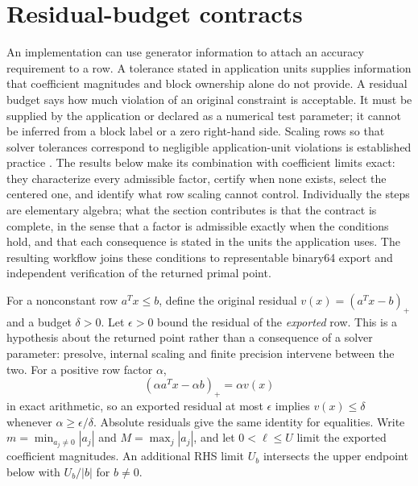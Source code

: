 \section{Residual-budget contracts}
\label{sec:contract}

An implementation can use generator information to attach an accuracy requirement to a row.
A tolerance stated in application units supplies information that coefficient magnitudes and
block ownership alone do not provide. A residual budget says how much violation of an original constraint is
acceptable. It must be supplied by the application or declared as a numerical test
parameter; it cannot be inferred from a block label or a zero right-hand side. Scaling rows
so that solver tolerances correspond to negligible application-unit violations is
established practice \cite{gurobiScaling,gurobiExternalScaling,idaesScaling}. The results
below make its combination with coefficient limits exact: they characterize every admissible
factor, certify when none exists, select the centered one, and identify what row scaling
cannot control. Individually the steps are elementary algebra; what the section contributes is
that the contract is complete, in the sense that a factor is admissible exactly when the
conditions hold, and that each consequence is stated in the units the application uses.
The resulting workflow joins these conditions to representable binary64 export and
independent verification of the returned primal point.

For a nonconstant row $a^Tx\le b$, define the original residual $v(x)=(a^Tx-b)_+$ and a
budget $\delta>0$. Let $\epsilon>0$ bound the residual of the \emph{exported} row. This is a
hypothesis about the returned point rather than a consequence of a solver parameter:
presolve, internal scaling and finite precision intervene between the two. For a positive
row factor $\alpha$,
\begin{equation}\label{eq:residual-transfer}
 (\alpha a^Tx-\alpha b)_+=\alpha v(x)
\end{equation}
in exact arithmetic, so an exported residual at most $\epsilon$ implies $v(x)\le\delta$
whenever $\alpha\ge\epsilon/\delta$. Absolute residuals give the same identity for
equalities. Write $m=\min_{a_j\ne0}|a_j|$ and $M=\max_j|a_j|$, and let $0<\ell\le U$ limit
the exported coefficient magnitudes. An additional RHS limit $U_b$ intersects the upper
endpoint below with $U_b/|b|$ for $b\ne0$.

